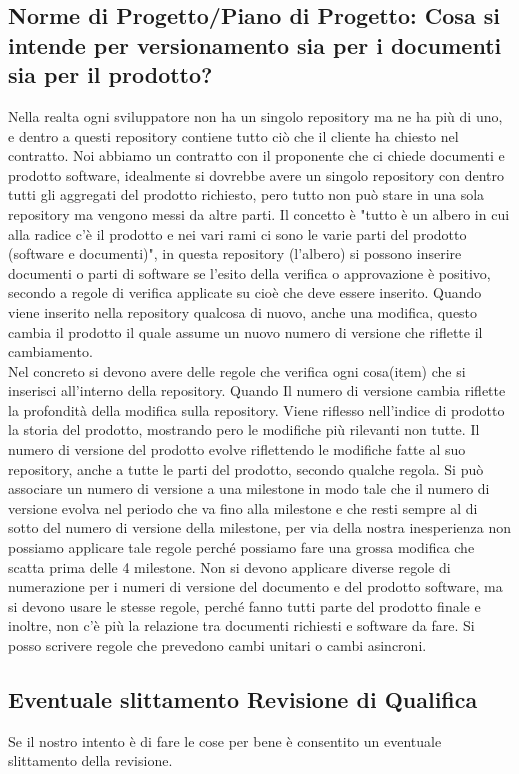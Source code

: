 \subsection{Norme di Progetto/Piano di Progetto: Cosa si intende per versionamento sia per i documenti sia per il prodotto?}
Nella realta ogni sviluppatore non ha un singolo repository ma ne ha più di uno, e dentro a questi repository contiene tutto ciò che il cliente ha chiesto nel contratto. Noi abbiamo un contratto con il proponente che ci chiede documenti e prodotto software, idealmente si dovrebbe avere un singolo repository con dentro tutti gli aggregati del prodotto richiesto, pero tutto non può stare in una sola repository ma vengono messi da altre parti. Il concetto è "tutto è un albero in cui alla radice c'è il prodotto e nei vari rami ci sono le varie parti del prodotto (software e documenti)", in questa repository (l'albero) si possono inserire documenti o parti di software se l'esito della verifica o approvazione è positivo, secondo a regole di verifica applicate su cioè che deve essere inserito. Quando viene inserito nella repository qualcosa di nuovo, anche una modifica, questo cambia il prodotto il quale assume un nuovo numero di versione che riflette il cambiamento.\\
Nel concreto si devono avere delle regole che verifica ogni cosa(item) che si inserisci all'interno della repository. Quando Il numero di versione cambia riflette la profondità della modifica sulla repository. Viene riflesso nell'indice di prodotto la storia del prodotto, mostrando pero le modifiche più rilevanti non tutte. Il numero di versione del prodotto evolve riflettendo le modifiche fatte al suo repository, anche a tutte le parti del prodotto, secondo qualche regola. Si può associare un numero di versione a una milestone in modo tale che il numero di versione evolva nel periodo che va fino alla milestone e che resti sempre al di sotto del numero di versione della milestone, per via della nostra inesperienza non possiamo applicare tale regole perché possiamo fare una grossa modifica che scatta prima delle 4 milestone. Non si devono applicare diverse regole di numerazione per i numeri di versione del documento e del prodotto software, ma si devono usare le stesse regole, perché fanno tutti parte del prodotto finale e inoltre, non c'è più la relazione tra documenti richiesti e software da fare. Si posso scrivere regole che prevedono cambi unitari o cambi asincroni.

\subsection{Eventuale slittamento Revisione di Qualifica}
Se il nostro intento è di fare le cose per bene è consentito un eventuale slittamento della revisione.

\clearpage